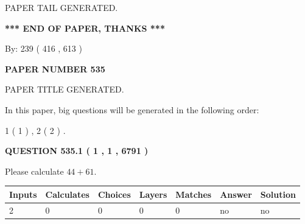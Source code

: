\documentclass[12pt]{article}
\begin{document}
   
   
\vspace{2.0in} PAPER TAIL GENERATED.
   
   
   
   
\vspace{1.0in} 
{\textbf{\large{ *** END OF PAPER, THANKS *** }}} 
   
   
\hspace{1.0in} By: 
 239 ( 416 ,  613 )
   
   
   
   
\newpage 
\setcounter{page}{ 
   535001 } 
   
   
   
   
 {\textbf{ \Large{ PAPER NUMBER  535  }}}
   
   
\vspace{0.2in}
   
   
   
   
   
   
   
   
 \vspace{0.2in}
 
 
 
 
   
   
 PAPER TITLE GENERATED.
   
   
   
\vspace{0.2in}
   
In this paper, big questions will be generated in the following order: 
   
   
   1 ( 1 )
 ,
   2 ( 2 )
 .
  
\vspace{0.2in}
  
{\textbf{\Large{QUESTION
535.1 
 ( 1 , 1 , 6791 )
}}}
  
  
 
Please calculate $ %
44 +  %
61 $.
 
 
   
   
   
   
\noindent\begin{tabular}{|l|l|l|l|l|l|l|}
 \hline
Inputs & Calculates & Choices & Layers & Matches & Answer & Solution \\ \hline
 2  & 
 0  & 
 0
  & 
 0  & 
 0  & 
  no & 
  no 
  \\ \hline
 \end{tabular}
   
\end{document}
